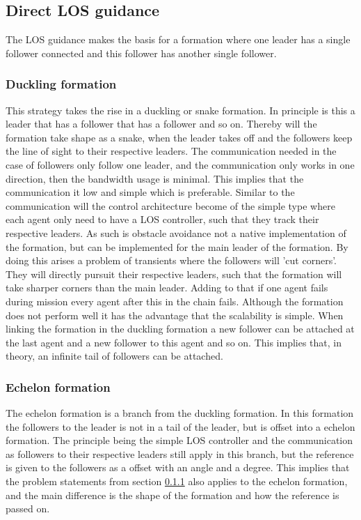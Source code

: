 \subsection{Direct LOS guidance}
The \ac{LOS} guidance makes the basis for a formation where one leader has a single follower connected and this follower has another single follower. 
\subsubsection{Duckling formation}
\label{sc:duckling}
This strategy takes the rise in a duckling or snake formation. In principle is this a leader that has a follower that has a follower and so on. Thereby will the formation take shape as a snake, when the leader takes off and the followers keep the line of sight to their respective leaders. The communication needed in the case of followers only follow one leader, and the communication only works in one direction, then the bandwidth usage is minimal. This implies that the communication it low and simple which is preferable. Similar to the communication will the control architecture become of the simple type where each agent only need to have a \ac{LOS} controller, such that they track their respective leaders. As such is obstacle avoidance not a native implementation of the formation, but can be implemented for the main leader of the formation. By doing this arises a problem of transients where the followers will 'cut corners'. They will directly pursuit their respective leaders, such that the formation will take sharper corners than the main leader. Adding to that if one agent fails during mission every agent after this in the chain fails. Although the formation does not perform well it has the advantage that the scalability is simple. When linking the formation in the duckling formation a new follower can be attached at the last agent and a new follower to this agent and so on. This implies that, in theory, an infinite tail of followers can be attached.

\subsubsection{Echelon formation}
The echelon formation is a branch from the duckling formation. In this formation the followers to the leader is not in a tail of the leader, but is offset into a echelon formation. The principle being the simple \ac{LOS} controller and the communication as followers to their respective leaders still apply in this branch, but the reference is given to the followers as a offset with an angle and a degree. This implies that the problem statements from section \ref{sc:duckling} also applies to the echelon formation, and the main difference is the shape of the formation and how the reference is passed on.

